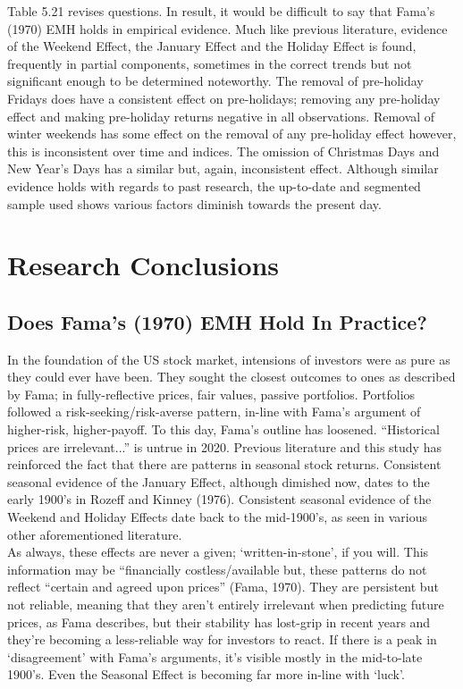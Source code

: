 \documentclass[11pt, english]{article}
\begin{document}
	Table 5.21 revises questions. In result, it would be difficult to say that Fama’s (1970) EMH holds in empirical evidence. Much like previous literature, evidence of the Weekend Effect, the January Effect and the Holiday Effect is found, frequently in partial components, sometimes in the correct trends but not significant enough to be determined noteworthy. The removal of pre-holiday Fridays does have a consistent effect on pre-holidays; removing any pre-holiday effect and making pre-holiday returns negative in all observations. Removal of winter weekends has some effect on the removal of any pre-holiday effect however, this is inconsistent over time and indices. The omission of Christmas Days and New Year’s Days has a similar but, again, inconsistent effect. Although similar evidence holds with regards to past research, the up-to-date and segmented sample used shows various factors diminish towards the present day.

\newpage 

	\section{Research Conclusions}

	\subsection{Does Fama’s (1970) EMH Hold In Practice?}

	In the foundation of the US stock market, intensions of investors were as pure as they could ever have been. They sought the closest outcomes to ones as described by Fama; in fully-reflective prices, fair values, passive portfolios. Portfolios followed a risk-seeking/risk-averse pattern, in-line with Fama’s argument of higher-risk, higher-payoff. To this day, Fama’s outline has loosened. ``Historical prices are irrelevant...'' is untrue in 2020. Previous literature and this study has reinforced the fact that there are patterns in seasonal stock returns. Consistent seasonal evidence of the January Effect, although dimished now, dates to the early 1900's in Rozeff and Kinney (1976). Consistent seasonal evidence of the Weekend and Holiday Effects date back to the mid-1900's, as seen in various other aforementioned literature.\\ 

As always, these effects are never a given; `written-in-stone', if you will. This information may be ``financially costless/available but, these patterns do not reflect ``certain and agreed upon prices'' (Fama, 1970). They are persistent but not reliable, meaning that they aren’t entirely irrelevant when predicting future prices, as Fama describes, but their stability has lost-grip in recent years and they’re becoming a less-reliable way for investors to react. If there is a peak in `disagreement' with Fama’s arguments, it’s visible mostly in the mid-to-late 1900’s. Even the Seasonal Effect is becoming far more in-line with `luck'.
\end{document}
